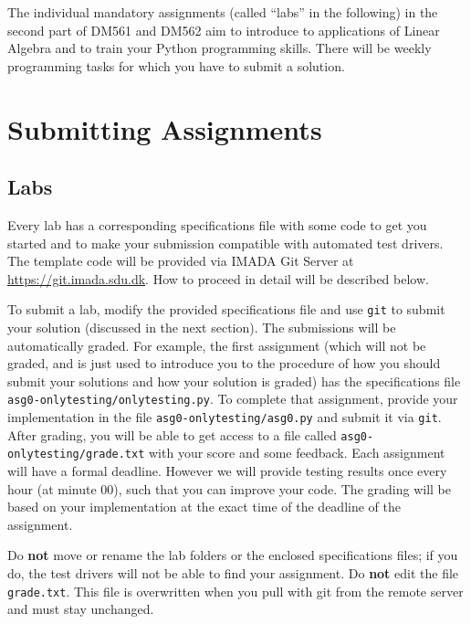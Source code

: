 
The individual mandatory assignments (called ``labs'' in the following) in the second part of DM561 and DM562 aim to introduce to applications of Linear Algebra and to train your Python programming skills. There will be weekly programming tasks for which you have to submit a solution.

\section*{Submitting Assignments} %

\subsection*{Labs}

Every lab has a corresponding specifications file with some code to get you started and to make your submission compatible with automated test drivers. The template code will be provided via IMADA Git Server at \url{https://git.imada.sdu.dk}. How to proceed in detail will be described below.


To submit a lab, modify the provided specifications file and use \texttt{git} to submit your solution (discussed in the next section).
The submissions will be automatically graded. 
For example, the first assignment (which will not be graded, and is just used to introduce you to the procedure of how you should submit your solutions and how your solution is graded) has the specifications file \texttt{asg0-onlytesting/onlytesting.py}.
To complete that assignment, provide your implementation in the file \texttt{asg0-onlytesting/asg0.py} and submit it via \texttt{git}.
After grading, you will be able to get access to a file called \texttt{asg0-onlytesting/grade.txt} with your score and some feedback. Each assignment will have a formal deadline. However we will provide testing results once every hour (at minute 00), such that you can improve your code. The grading will be based on your implementation at the exact time of the deadline of the assignment.


\begin{warn}
Do \textbf{not} move or rename the lab folders or the enclosed
specifications files; if you do, the test drivers will not be able to
find your assignment. Do \textbf{not} edit the file
\texttt{grade.txt}. This file is overwritten when you pull with git from
the remote server and must stay unchanged. 
\end{warn}


